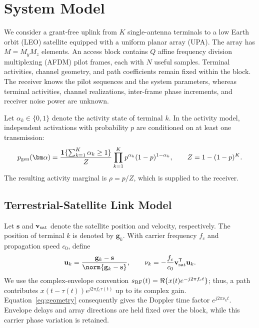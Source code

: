 \section{System Model}
\label{sec:system}

We consider a grant-free uplink from $K$ single-antenna terminals to a
low Earth orbit (LEO) satellite equipped with a uniform planar array (UPA).
The array has $M=M_yM_z$ elements. An access block contains $Q$ affine
frequency division multiplexing (AFDM) pilot frames, each with $N$ useful
samples. Terminal activities, channel geometry, and path coefficients
remain fixed within the block.
The receiver knows the pilot sequences and the system parameters,
whereas terminal activities, channel realizations, inter-frame phase
increments, and receiver noise power are unknown.

Let $\alpha_k\in\{0,1\}$ denote the activity state of terminal $k$.
In the activity model, independent activations with
probability $p$ are conditioned on at least one transmission:
\begin{equation}
 p_{\rm gen}(\bm\alpha)=
 \frac{\mathbf{1}\{\sum_{k=1}^{K}\alpha_k\geq1\}}{Z}
 \prod_{k=1}^{K}p^{\alpha_k}(1-p)^{1-\alpha_k},
 \qquad Z=1-(1-p)^K.
 \label{eq:activity-generation}
\end{equation}
The resulting activity marginal is $\rho=p/Z$, which is supplied to
the receiver.

\subsection{Terrestrial-Satellite Link Model}

Let $\mathbf{s}$ and $\mathbf{v}_{\rm sat}$ denote the satellite position
and velocity, respectively. The position of terminal $k$ is denoted by
$\mathbf{g}_k$.
With carrier frequency $f_c$ and propagation speed $c_0$, define
\begin{equation}
 \mathbf{u}_k=\frac{\mathbf{g}_k-\mathbf{s}}
 {\norm{\mathbf{g}_k-\mathbf{s}}},
 \qquad
 \nu_k=-\frac{f_c}{c_0}\mathbf{v}_{\rm sat}^{\mathsf T}\mathbf{u}_k.
 \label{eq:geometry}
\end{equation}
We use the complex-envelope convention
$s_{\rm RF}(t)=\Re\{x(t)e^{-j2\pi f_ct}\}$; thus, a path contributes
$x(t-\tau(t))e^{j2\pi f_c\tau(t)}$ up to its complex gain.
Equation~\eqref{eq:geometry} consequently gives the Doppler time factor
$e^{j2\pi\nu_kt}$. Envelope delays and array directions are held fixed
over the block, while this carrier phase variation is retained.

